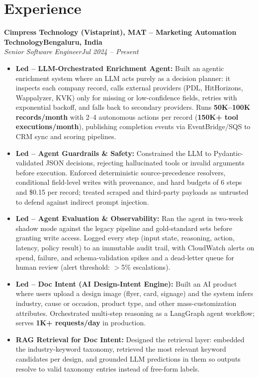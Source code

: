 \documentclass[10pt]{article}
\newcommand{\role}[4]{\textbf{#1}\hfill\textbf{#2}\\ \textit{#3}\hfill\textit{#4}\par\vspace{1pt}}
\begin{document}
\section*{Experience}
\role{Cimpress Technology (Vistaprint), MAT -- Marketing Automation Technology}{Bengaluru, India}{Senior Software Engineer}{Jul 2024 -- Present}
\begin{itemize}
\item \textbf{Led -- LLM-Orchestrated Enrichment Agent:} Built an agentic enrichment system where an LLM acts purely as a decision planner: it inspects each company record, calls external providers (PDL, HitHorizons, Wappalyzer, KVK) only for missing or low-confidence fields, retries with exponential backoff, and falls back to secondary providers. Runs \textbf{50K--100K records/month} with 2--4 autonomous actions per record (\textbf{150K+ tool executions/month}), publishing completion events via EventBridge/SQS to CRM sync and scoring pipelines.
\item \textbf{Led -- Agent Guardrails \& Safety:} Constrained the LLM to Pydantic-validated JSON decisions, rejecting hallucinated tools or invalid arguments before execution. Enforced deterministic source-precedence resolvers, conditional field-level writes with provenance, and hard budgets of 6 steps and \$0.15 per record; treated scraped and third-party payloads as untrusted to defend against indirect prompt injection.
\item \textbf{Led -- Agent Evaluation \& Observability:} Ran the agent in two-week shadow mode against the legacy pipeline and gold-standard sets before granting write access. Logged every step (input state, reasoning, action, latency, policy result) to an immutable audit trail, with CloudWatch alerts on spend, failure, and schema-validation spikes and a dead-letter queue for human review (alert threshold: $>$5\% escalations).
\item \textbf{Led -- Doc Intent (AI Design-Intent Engine):} Built an AI product where users upload a design image (flyer, card, signage) and the system infers industry, cause or occasion, product type, and other mass-customization attributes. Orchestrated multi-step reasoning as a LangGraph agent workflow; serves \textbf{1K+ requests/day} in production.
\item \textbf{RAG Retrieval for Doc Intent:} Designed the retrieval layer: embedded the industry-keyword taxonomy, retrieved the most relevant keyword candidates per design, and grounded LLM predictions in them so outputs resolve to valid taxonomy entries instead of free-form labels.

\end{itemize}
\end{document}
